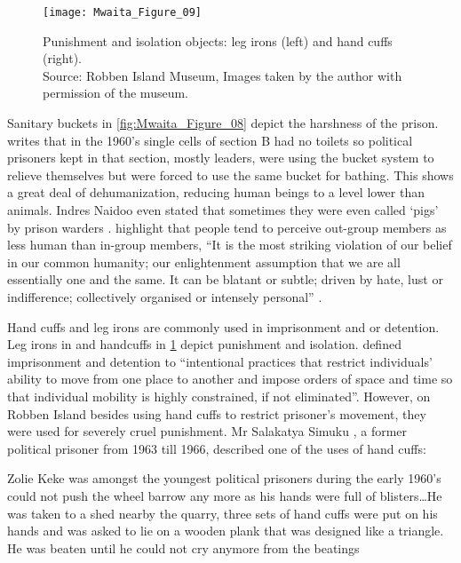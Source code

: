 \begin{figure}[!p]
	\texttt{[image: Mwaita\_Figure\_09]}
	\caption{Punishment and isolation objects: leg irons (left) and hand cuffs (right).
  {\normalfont\scriptsize \\   Source: Robben Island Museum, Images taken by the author with permission of the museum.
                    }}
  	\label{fig:Mwaita_Figure_09}
\end{figure}


Sanitary buckets in \cref{fig:Mwaita_Figure_08} depict the harshness of the prison. \textcite[67--68]{Naidoo_1982} writes that in the 1960's single cells of section B had no toilets so political prisoners kept in that section, mostly leaders, were using the bucket system to relieve themselves but were forced to use the same bucket for bathing. This shows a great deal of dehumanization, reducing human beings to a level lower than animals. Indres Naidoo even stated that sometimes they were even called ‘pigs’ by prison warders \parencite{Naidoo_1982}.
\textcite{Haslam_2014} highlight that people tend to perceive out-group members as less human than in-group members, “It is the most striking violation of our belief in our common humanity; our enlightenment assumption that we are all essentially one and the same. It can be blatant or subtle; driven by hate, lust or indifference; collectively organised or intensely personal” \parencite[401]{Haslam_2014}.



Hand cuffs and leg irons are commonly used in imprisonment and or detention. Leg irons in and handcuffs in  \cref{fig:Mwaita_Figure_09} depict punishment and isolation. \textcite{Martin_2009} defined imprisonment and detention to “intentional practices that restrict individuals’ ability to move from one place to another and impose orders of space and time so that individual mobility is highly constrained, if not eliminated”. However, on Robben Island besides using hand cuffs to restrict prisoner’s movement, they were used for severely cruel punishment. Mr Salakatya Simuku \parencite[in][]{Robben_2003}, a former political prisoner from 1963 till 1966, described one of the uses of hand cuffs:

\begin{IJSRAquote}{\cite{Robben_2003}}
    {Zolie Keke was amongst the youngest political prisoners during the early 1960's could not push the wheel barrow any more as his hands were full of blisters…He was taken to a shed nearby the quarry, three sets of hand cuffs were put on his hands and was asked to lie on a wooden plank that was designed like a triangle. He was beaten until he could not cry anymore from the beatings}
\end{IJSRAquote}


